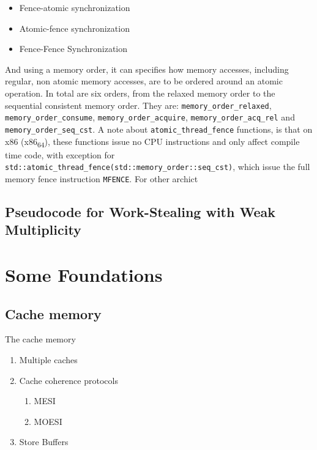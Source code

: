 \documentclass[openany, a4paper]{book}
\theoremstyle{break}
\theoremstyle{example}
\theoremstyle{note}
\theoremstyle{break}
\theoremstyle{exercise}
\begin{document}
\begin{itemize}
\item Fence-atomic synchronization
\item Atomic-fence synchronization
\item Fence-Fence Synchronization
\end{itemize}

And using a memory order\cite{memoryOrderCpp2020}, it can specifies how
memory accesses, including regular, non atomic memory accesses, are to be
ordered around an atomic operation. In total are six orders, from the
relaxed memory order to the sequential consistent memory order. They are:
\texttt{memory\_order\_relaxed}, \texttt{memory\_order\_consume}, \texttt{memory\_order\_acquire},
\texttt{memory\_order\_acq\_rel} and \texttt{memory\_order\_seq\_cst}. A note about
\texttt{atomic\_thread\_fence} functions, is that on x86 (x86\textsubscript{64}), these functions
issue no CPU instructions and only affect compile time code, with exception
for \texttt{std::atomic\_thread\_fence(std::memory\_order::seq\_cst)}, which issue the
full memory fence instruction \texttt{MFENCE}. For other archict

\section{Pseudocode for Work-Stealing with Weak Multiplicity}
\label{sec:orgf0adbce}



\chapter{Some Foundations}
\label{sec:org1c29b2a}

\section{Cache memory}
\label{sec:org455c1d4}

The cache memory

\begin{enumerate}
\item Multiple caches
\label{sec:org1aad1cf}


\item Cache coherence protocols
\label{sec:orge3224db}



\begin{enumerate}
\item MESI
\label{sec:orgd413dc5}


\item MOESI
\label{sec:org6216da4}
\end{enumerate}


\item Store Buffers
\label{sec:orgfaeade6}
\end{enumerate}
\end{document}
